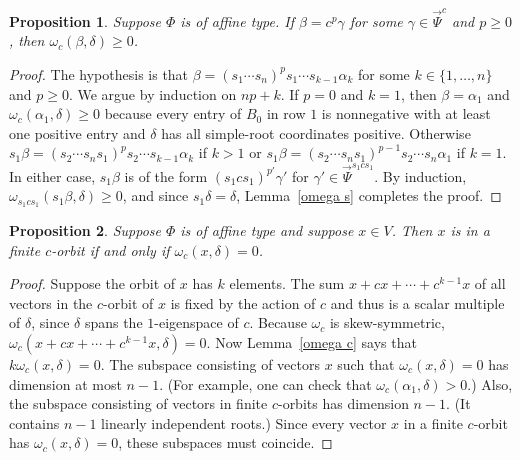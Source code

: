 \documentclass[10pt]{article}
\newtheorem{proposition}{Proposition}[section]
\theoremstyle{definition}
\theoremstyle{remark}
\numberwithin{equation}{section}
\newcommand{\set}[1]{{\lbrace #1 \rbrace}}
\newcommand{\0}{{\mathbf{0}}}
\newcommand{\RSChar}{\Phi}
\newcommand{\RS}{\RSChar}
\newcommand{\TravInfChar}{\Psi}
\newcommand{\TravProj}[1]{\overrightarrow{\TravInfChar}^{#1}}
\begin{document}
\begin{proposition}\label{om del}
Suppose $\RS$ is of affine type.
If $\beta=c^p\gamma$ for some $\gamma\in\TravProj{c}$ and $p\ge0$, then $\omega_c(\beta,\delta)\ge0$. 
\end{proposition}
\begin{proof}
The hypothesis is that $\beta=(s_1\cdots s_n)^ps_1\cdots s_{k-1}\alpha_k$ for some $k\in\set{1,\ldots,n}$ and $p\ge0$.
We argue by induction on $np+k$.
If $p=0$ and $k=1$, then $\beta=\alpha_1$ and $\omega_c(\alpha_1,\delta)\ge0$ because every entry of $B_0$ in row $1$ is nonnegative with at least one positive entry and $\delta$ has all simple-root coordinates positive.
Otherwise $s_1\beta=(s_2\cdots s_ns_1)^ps_2\cdots s_{k-1}\alpha_k$ if $k>1$ or $s_1\beta=(s_2\cdots s_ns_1)^{p-1}s_2\cdots s_n\alpha_1$ if $k=1$.
In either case, $s_1\beta$ is of the form $(s_1cs_1)^{p'}\gamma'$ for $\gamma'\in\TravProj{s_1cs_1}$.
By induction, $\omega_{s_1cs_1}(s_1\beta,\delta)\ge0$, and since $s_1\delta=\delta$, Lemma~\ref{omega s} completes the proof.
\end{proof}


\begin{proposition}\label{om del fin}
Suppose $\RS$ is of affine type and suppose $x\in V$.
Then $x$ is in a finite $c$-orbit if and only if $\omega_c(x,\delta)=0$.
\end{proposition}
\begin{proof}
Suppose the orbit of $x$ has $k$ elements.
The sum $x+cx+\cdots+c^{k-1}x$ of all vectors in the $c$-orbit of $x$ is fixed by the action of $c$ and thus is a scalar multiple of $\delta$, since $\delta$ spans the $1$-eigenspace of $c$.
Because $\omega_c$ is skew-symmetric, $\omega_c(x+cx+\cdots+c^{k-1}x,\delta)=0$.
Now Lemma~\ref{omega c} says that $k\omega_c(x,\delta)=0$.
The subspace consisting of vectors $x$ such that $\omega_c(x,\delta)=0$ has dimension at most $n-1$.
(For example, one can check that $\omega_c(\alpha_1,\delta)>0$.)
Also, the subspace consisting of vectors in finite $c$-orbits has dimension $n-1$.
(It contains $n-1$ linearly independent roots.)
Since every vector $x$ in a finite $c$-orbit has $\omega_c(x,\delta)=0$, these subspaces must coincide.
\end{proof}
\end{document}
